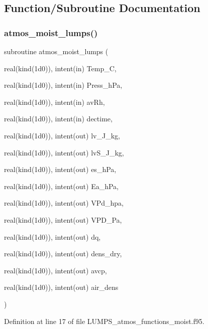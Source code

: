 \subsection{Function/\+Subroutine Documentation}
\mbox{\label{_l_u_m_p_s__atmos__functions__moist_8f95_ae6aae41b4a8fe866a54025d8fbc439d2}} 
\subsubsection{\texorpdfstring{atmos\+\_\+moist\+\_\+lumps()}{atmos\_moist\_lumps()}}
{\footnotesize\ttfamily subroutine atmos\+\_\+moist\+\_\+lumps (\begin{DoxyParamCaption}\item[{real(kind(1d0)), intent(in)}]{Temp\+\_\+C,  }\item[{real(kind(1d0)), intent(in)}]{Press\+\_\+h\+Pa,  }\item[{real(kind(1d0)), intent(in)}]{av\+Rh,  }\item[{real(kind(1d0)), intent(in)}]{dectime,  }\item[{real(kind(1d0)), intent(out)}]{lv\+\_\+\+J\+\_\+kg,  }\item[{real(kind(1d0)), intent(out)}]{lv\+S\+\_\+\+J\+\_\+kg,  }\item[{real(kind(1d0)), intent(out)}]{es\+\_\+h\+Pa,  }\item[{real(kind(1d0)), intent(out)}]{Ea\+\_\+h\+Pa,  }\item[{real(kind(1d0)), intent(out)}]{V\+Pd\+\_\+hpa,  }\item[{real(kind(1d0)), intent(out)}]{V\+P\+D\+\_\+\+Pa,  }\item[{real(kind(1d0)), intent(out)}]{dq,  }\item[{real(kind(1d0)), intent(out)}]{dens\+\_\+dry,  }\item[{real(kind(1d0)), intent(out)}]{avcp,  }\item[{real(kind(1d0)), intent(out)}]{air\+\_\+dens }\end{DoxyParamCaption})}



Definition at line 17 of file L\+U\+M\+P\+S\+\_\+atmos\+\_\+functions\+\_\+moist.\+f95.

